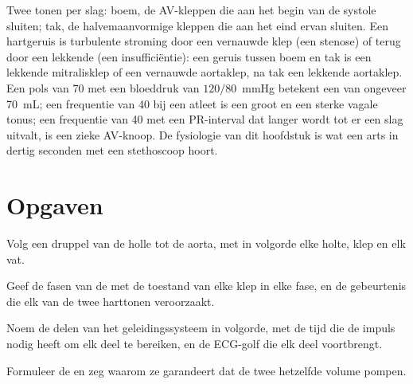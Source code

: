 \begin{example}\label{ex:b2:heart:reading}
Twee tonen per slag: boem, de AV-kleppen die aan het begin van de systole
sluiten; tak, de halvemaanvormige kleppen die aan het eind ervan sluiten.
Een hartgeruis is turbulente stroming door een vernauwde klep (een stenose)
of terug door een lekkende (een insufficiëntie): een geruis tussen boem en
tak is een lekkende mitralisklep of een vernauwde aortaklep, na tak een
lekkende aortaklep. Een pols van 70 met een bloeddruk van
$120/80$~mmHg betekent een  van ongeveer \qty{70}{mL};
een frequentie van 40 bij een atleet is een groot  en een sterke
vagale tonus; een frequentie van 40 met een PR-interval dat langer wordt tot
er een slag uitvalt, is een zieke AV-knoop. De fysiologie van dit hoofdstuk
is wat een arts in dertig seconden met een stethoscoop hoort.
\end{example}

\section{Opgaven}

\begin{exercise}[$\star$]\label{exo:b2:heart:1}
Volg een druppel  van de holle  tot de aorta, met in volgorde elke
holte, klep en elk vat.
\end{exercise}

\begin{exercise}[$\star$]\label{exo:b2:heart:2}
Geef de fasen van de  met de toestand van elke klep in elke fase,
en de gebeurtenis die elk van de twee harttonen veroorzaakt.
\end{exercise}

\begin{exercise}[$\star$]\label{exo:b2:heart:3}
Noem de delen van het geleidingssysteem in volgorde, met de tijd die de
impuls nodig heeft om elk deel te bereiken, en de ECG-golf die elk deel
voortbrengt.
\end{exercise}

\begin{exercise}[$\star$]\label{exo:b2:heart:4}
Formuleer de  en zeg waarom ze garandeert dat de twee
 hetzelfde volume pompen.
\end{exercise}

